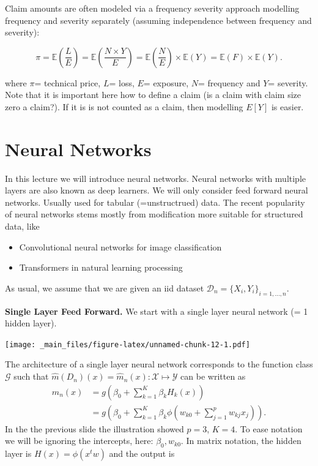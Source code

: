 \documentclass[
]{book}
\providecommand{\tightlist}{%
  \setlength{\itemsep}{0pt}\setlength{\parskip}{0pt}}
\begin{document}
Claim amounts are often modeled via a frequency severity approach modelling frequency and severity separately (assuming independence between frequency and severity):

\[
\pi=\mathbb{E}\left(\frac{L}{E}\right) = \mathbb{E}\left(\frac{N\times Y}{E}\right)= \mathbb{E}\left(\frac{N}{E}\right) \times  \mathbb{E}\left(Y\right)=\mathbb{E}(F) \times \mathbb{E}(Y).
\]

where \(\pi\)= technical price, \(L\)= loss, \(E\)= exposure, \(N\)= frequency and \(Y\)= severity. Note that it is important here how to define a claim (is a claim with claim size zero a claim?). If it is is not counted as a claim, then modelling \(E[Y]\) is easier.

\hypertarget{neural-networks}{%
\section{Neural Networks}\label{neural-networks}}

In this lecture we will introduce neural networks. Neural networks with multiple layers are also known as deep learners. We will only consider feed forward neural networks. Usually used for tabular (=unstructrued) data. The recent popularity of neural networks stems mostly from modification more suitable for structured data, like

\begin{itemize}
\tightlist
\item
  Convolutional neural networks for image classification
\item
  Transformers in natural learning processing
\end{itemize}

As usual, we assume that we are given an iid dataset \(\mathcal D_n=\{X_i,Y_i\}_{i=1,\dots,n}\).

\textbf{Single Layer Feed Forward.} We start with a single layer neural network (= 1 hidden layer).

\texttt{[image: \_main\_files/figure-latex/unnamed-chunk-12-1.pdf]}

The architecture of a single layer neural network corresponds to
the function class \(\mathcal G\) such that
\(\hat m(D_n)(x)=\hat m_n(x): \mathcal X \mapsto \mathcal Y\) can be written as
\begin{align}
\hat m_n(x)&=g\left(\beta_0 + \sum_{k=1}^{K} \beta_kH_k(x)\right)\\
&= g\left(\beta_0 + \sum_{k=1}^{K} \beta_k\phi\left(w_{k0} + \sum_{j=1}^p w_{kj}x_j\right)\right).
\end{align}
In the the previous slide the illustration showed \(p=3\), \(K=4\). To ease notation we will be ignoring the intercepts, here: \(\beta_0, w_{k0}\). In matrix notation, the hidden layer is \(H(x)=\phi(x^tw)\) and the output is
\end{document}
